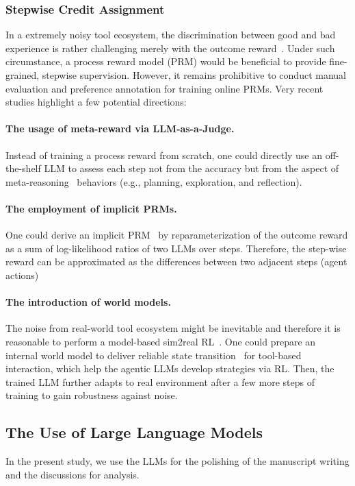 \documentclass[]{youtu} %
\begin{document}
{\subsubsection{Stepwise Credit Assignment}
In a extremely noisy tool ecosystem, the discrimination between good and bad experience is rather challenging merely with the outcome reward~\cite{deng2025effect,zeng2025reinforcing}.
Under such circumstance,
a process reward model (PRM) would be beneficial to provide fine-grained, stepwise supervision.
However, it remains prohibitive to conduct manual evaluation and preference annotation for training online PRMs.
Very recent studies highlight a few potential directions:
\paragraph{The usage of meta-reward via LLM-as-a-Judge.} Instead of  training a process reward from scratch, one could directly use an off-the-shelf LLM to assess each step not from the accuracy but from  the aspect of meta-reasoning~\cite{zhang2025rlvmr} behaviors (e.g., planning, exploration, and reflection).
\paragraph{The employment of implicit PRMs.} One could derive an implicit PRM~\cite{cui2025process} by reparameterization of the outcome reward as a sum of log-likelihood ratios of two LLMs over steps.  Therefore, the step-wise reward can be approximated as the differences between two adjacent steps (agent actions)~\cite{liu2025agentic}
\paragraph{The introduction of world models.} The noise from real-world tool ecosystem might be inevitable and therefore it is reasonable to perform a model-based sim2real RL~\cite{moerland2023model}. One could prepare an internal world model to deliver reliable state transition~\cite{gu2024your} for tool-based interaction, which help the agentic LLMs develop strategies via RL. Then, the trained LLM further adapts to real environment after a few more steps of training to gain robustness against noise.
}







\subsection{The Use of Large Language Models}
In the present study,
{we use the LLMs for the polishing of the manuscript writing and the discussions for analysis.}
\end{document}
